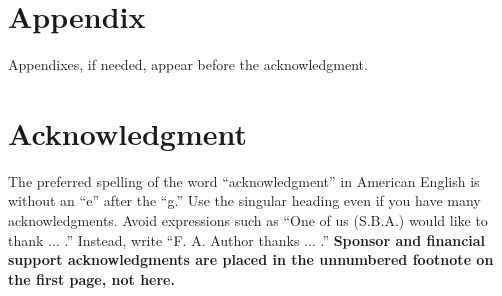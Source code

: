 \documentclass[transmag]{IEEEtran}
\begin{document}
\section*{Appendix}

Appendixes, if needed, appear before the acknowledgment.

\section*{Acknowledgment}

The preferred spelling of the word ``acknowledgment'' in American English is 
without an ``e'' after the ``g.'' Use the singular heading even if you have 
many acknowledgments. Avoid expressions such as ``One of us (S.B.A.) would 
like to thank $\ldots$ .'' Instead, write ``F. A. Author thanks $\ldots$ .'' 
\textbf{Sponsor and financial support acknowledgments are placed in the 
unnumbered footnote on the first page, not here.}
\end{document}
